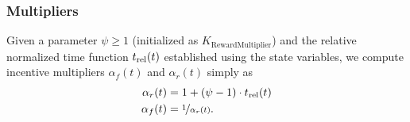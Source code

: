 \documentclass[9pt,oneside]{amsart}
\begin{document}
\begin{multicols}{2}
\subsubsection{Multipliers}
Given a parameter $\psi \geq 1$ (initialized as $K_{\mathrm{RewardMultiplier}}$) and the relative normalized time function $t_\textnormal{rel}(t)$ established using the state variables, we compute incentive multipliers $\alpha_f(t)$ and $\alpha_r(t)$ simply as
\begin{align}
\alpha_r(t) &= 1 + (\psi - 1)\cdot t_\textnormal{rel}(t) \\ 
\alpha_f(t) &= \nicefrac{1}{\alpha_r(t)}.
\end{align}







\end{multicols}
\end{document}
